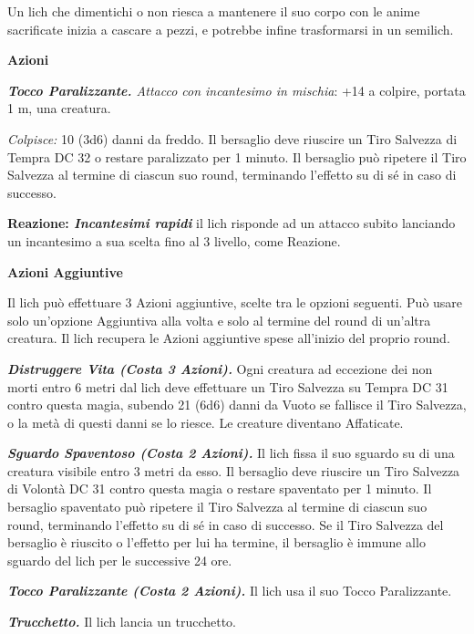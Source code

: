 \begin{multicols}{2}
{Un lich che dimentichi o non riesca a mantenere il suo corpo con le anime sacrificate inizia a cascare a pezzi, e potrebbe infine trasformarsi in un semilich.

\textbf{Azioni}

\emph{\textbf{Tocco Paralizzante.} Attacco con incantesimo in mischia}: +14 a colpire, portata 1 m, una creatura.

\emph{Colpisce:} 10 (3d6) danni da freddo. Il bersaglio deve riuscire un Tiro Salvezza di Tempra DC 32 o restare paralizzato per 1 minuto. Il bersaglio può ripetere il Tiro Salvezza al termine di ciascun suo round, terminando l'effetto su di sé in caso di successo.

\textbf{Reazione: \emph{Incantesimi rapidi}} il lich risponde ad un attacco subito lanciando un incantesimo a sua scelta fino al 3 livello, come Reazione.

\textbf{Azioni Aggiuntive}

Il lich può effettuare 3 Azioni aggiuntive, scelte tra le opzioni seguenti. Può usare solo un'opzione Aggiuntiva alla volta e solo al termine del round di un'altra creatura. Il lich recupera le Azioni aggiuntive spese all'inizio del proprio round.

\emph{\textbf{Distruggere Vita (Costa 3 Azioni).}} Ogni creatura ad eccezione dei non morti entro 6 metri dal lich deve effettuare un Tiro Salvezza su Tempra DC 31 contro questa magia, subendo 21 (6d6) danni da Vuoto se fallisce il Tiro Salvezza, o la metà di questi danni se lo riesce. Le creature diventano Affaticate.

\emph{\textbf{Sguardo Spaventoso (Costa 2 Azioni).}} Il lich fissa il suo sguardo su di una creatura visibile entro 3 metri da esso. Il bersaglio deve riuscire un Tiro Salvezza di Volontà DC 31 contro questa magia o restare spaventato per 1 minuto. Il bersaglio spaventato può ripetere il Tiro Salvezza al termine di ciascun suo round, terminando l'effetto su di sé in caso di successo. Se il Tiro Salvezza del bersaglio è riuscito o l'effetto per lui ha termine, il bersaglio è immune allo sguardo del lich per le successive 24 ore.

\emph{\textbf{Tocco Paralizzante (Costa 2 Azioni).}} Il lich usa il suo Tocco Paralizzante.

\emph{\textbf{Trucchetto.}} Il lich lancia un trucchetto.

}
\end{multicols}
